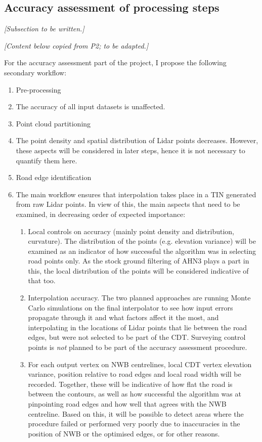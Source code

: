 \subsection{Accuracy assessment of processing steps}
\label{sub:accuracyoverview}

\textit{[Subsection to be written.]}

\textit{[Content below copied from P2; to be adapted.]}

For the accuracy assessment part of the project, I propose the following secondary workflow:

\begin{enumerate}
    \item Pre-processing
    \item[] The accuracy of all input datasets is unaffected.
    \item Point cloud partitioning
    \item[] The point density and spatial distribution of Lidar points decreases. However, these aspects will be considered in later steps, hence it is not necessary to quantify them here.
    \item Road edge identification
    \item[] The main workflow ensures that interpolation takes place in a TIN generated from raw Lidar points. In view of this, the main aspects that need to be examined, in decreasing order of expected importance:
    \begin{enumerate}
        \item Local controls on accuracy (mainly point density and distribution, curvature). The distribution of the points (e.g. elevation variance) will be examined as an indicator of how successful the algorithm was in selecting road points only. As the stock ground filtering of AHN3 plays a part in this, the local distribution of the points will be considered indicative of that too.
        \item Interpolation accuracy. The two planned approaches are running Monte Carlo simulations on the final interpolator to see how input errors propagate through it and what factors affect it the most, and interpolating in the locations of Lidar points that lie between the road edges, but were not selected to be part of the CDT. Surveying control points is \textit{not} planned to be part of the accuracy assessment procedure.
        \item For each output vertex on NWB centrelines, local CDT vertex elevation variance, position relative to road edges and local road width will be recorded. Together, these will be indicative of how flat the road is between the contours, as well as how successful the algorithm was at pinpointing road edges and how well that agrees with the NWB centreline. Based on this, it will be possible to detect areas where the procedure failed or performed very poorly due to inaccuracies in the position of NWB or the optimised edges, or for other reasons.

\end{enumerate}
\end{enumerate}
